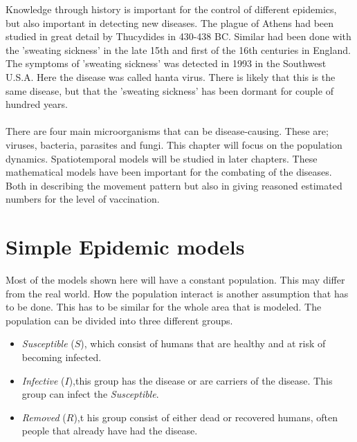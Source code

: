 \documentclass[%
twoside,                 %
final,                   %
10pt]{article}
\begin{document}
Knowledge through history is important for the control of different epidemics, but also important in detecting new diseases. The plague of Athens had been studied in great detail by Thucydides in 430-438 BC. Similar had been done with the 'sweating sickness' in the late 15th and first of the 16th centuries in England. The symptoms of 'sweating sickness' was detected in 1993 in the Southwest U.S.A. Here the disease was called hanta virus. There is likely that this is the same disease, but that the 'sweating sickness' has been dormant for couple of hundred years.
\\
\\
There are four main microorganisms that can be disease-causing. These are; viruses, bacteria, parasites and fungi. This chapter will focus on the population dynamics. Spatiotemporal models will be studied in later chapters. These mathematical models have been important for the combating of the diseases. Both in describing the movement pattern but also in giving reasoned estimated numbers for the level of vaccination.

\section{Simple Epidemic models}
Most of the models shown here will have a constant population. This may differ from the real world. How the population interact is another assumption that has to be done. This has to be similar for the whole area that is modeled. The population can be divided into three different groups. 
\begin{itemize}
\item \emph{Susceptible} ($S$), which consist of humans that are healthy and at risk of becoming infected. 

\item \emph{Infective} ($I$),this group has the disease or are carriers of the disease. This group can infect the \emph{Susceptible}. 

\item \emph{Removed} ($R$),t his group consist of either dead or recovered humans, often people that already have had the disease. 
\end{itemize}
\end{document}
